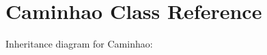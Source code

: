 \hypertarget{classCaminhao}{}\section{Caminhao Class Reference}
\label{classCaminhao}


Inheritance diagram for Caminhao\+:

